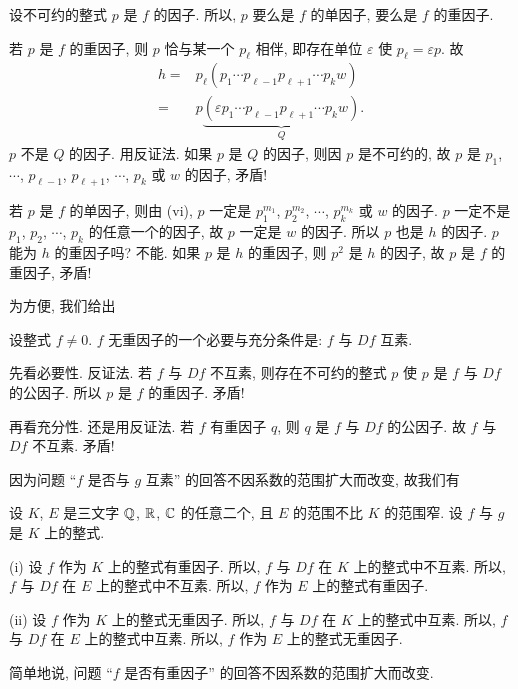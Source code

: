 \begin{pf}
    设不可约的整式 $p$ 是 $f$ 的因子. 所以, $p$ 要么是 $f$ 的单因子, 要么是 $f$ 的重因子.

    若 $p$ 是 $f$ 的重因子, 则 $p$ 恰与某一个 $p_\ell$ 相伴, 即存在单位 $\varepsilon$ 使 $p_\ell = \varepsilon p$. 故
    \begin{align*}
        h
        = {} & p_\ell (p_1 \cdots p_{\ell - 1} p_{\ell + 1} \cdots p_k w)                          \\
        = {} & p \underbrace{(\varepsilon p_1 \cdots p_{\ell - 1} p_{\ell + 1} \cdots p_k w)}_{Q}.
    \end{align*}
    $p$ 不是 $Q$ 的因子. 用反证法. 如果 $p$ 是 $Q$ 的因子, 则因 $p$ 是不可约的, 故 $p$ 是 $p_1$, $\cdots$, $p_{\ell - 1}$, $p_{\ell + 1}$, $\cdots$, $p_k$ 或 $w$ 的因子, 矛盾!

    若 $p$ 是 $f$ 的单因子, 则由 (vi), $p$ 一定是 $p_1^{m_1}$, $p_2^{m_2}$, $\cdots$, $p_k^{m_k}$ 或 $w$ 的因子. $p$ 一定不是 $p_1$, $p_2$, $\cdots$, $p_k$ 的任意一个的因子, 故 $p$ 一定是 $w$ 的因子. 所以 $p$ 也是 $h$ 的因子. $p$ 能为 $h$ 的重因子吗? 不能. 如果 $p$ 是 $h$ 的重因子, 则 $p^2$ 是 $h$ 的因子, 故 $p$ 是 $f$ 的重因子, 矛盾!
\end{pf}

为方便, 我们给出
\begin{proposition}
    设整式 $f \neq 0$. $f$ 无重因子的一个必要与充分条件是: $f$ 与 $Df$ 互素.
\end{proposition}

\begin{pf}
    先看必要性. 反证法. 若 $f$ 与 $Df$ 不互素, 则存在不可约的整式 $p$ 使 $p$ 是 $f$ 与 $Df$ 的公因子. 所以 $p$ 是 $f$ 的重因子. 矛盾!

    再看充分性. 还是用反证法. 若 $f$ 有重因子 $q$, 则 $q$ 是 $f$ 与 $Df$ 的公因子. 故 $f$ 与 $Df$ 不互素. 矛盾!
\end{pf}

因为问题 ``$f$ 是否与 $g$ 互素'' 的回答不因系数的范围扩大而改变, 故我们有
\begin{proposition}
    设 $K$, $E$ 是三文字 $\mathbb{Q}$, $\mathbb{R}$, $\mathbb{C}$ 的任意二个, 且 $E$ 的范围不比 $K$ 的范围窄. 设 $f$ 与 $g$ 是 $K$ 上的整式.

    (i) 设 $f$ 作为 $K$ 上的整式有重因子. 所以, $f$ 与 $Df$ 在 $K$ 上的整式中不互素. 所以, $f$ 与 $Df$ 在 $E$ 上的整式中不互素. 所以, $f$ 作为 $E$ 上的整式有重因子.

    (ii) 设 $f$ 作为 $K$ 上的整式无重因子. 所以, $f$ 与 $Df$ 在 $K$ 上的整式中互素. 所以, $f$ 与 $Df$ 在 $E$ 上的整式中互素. 所以, $f$ 作为 $E$ 上的整式无重因子.

    简单地说, 问题 ``$f$ 是否有重因子'' 的回答不因系数的范围扩大而改变.
\end{proposition}

